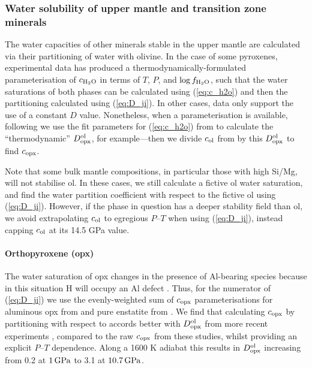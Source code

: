 \subsubsection{Water solubility of upper mantle and transition zone minerals}

The water capacities of other minerals stable in the upper mantle are calculated via their partitioning of water with olivine. In the case of some pyroxenes, experimental data has produced a thermodynamically-formulated parameterisation of $c_{\rm H_2O}$ in terms of $T$, $P$, and $\log f_{\rm H_2O}$, such that the water saturations of both phases can be calculated using (\ref{eq:c_h2o}) and then the partitioning calculated using (\ref{eq:D_ji}). In other cases, data only support the use of a constant $D$ value. Nonetheless, when a parameterisation is available, following \citet{dong_constraining_2021} we use the fit parameters for (\ref{eq:c_h2o}) from \citet{kohlstedt_solubility_1996} to calculate the ``thermodynamic'' $D^{\rm ol}_{\rm opx}$, for example---then we divide $c_{\rm ol}$ from \citet{dong_constraining_2021} by this $D^{\rm ol}_{\rm opx}$ to find $c_{\rm opx}$. %

Note that some bulk mantle compositions, in particular those with high Si/Mg, will not stabilise ol. In these cases, we still calculate a fictive ol water saturation, and find the water partition coefficient with respect to the fictive ol using (\ref{eq:D_ji}). However, if the phase in question has a deeper stability field than ol, we avoid extrapolating $c_{\rm ol}$ to egregious $P$--$T$ when using (\ref{eq:D_ji}), instead capping $c_{\rm ol}$ at its 14.5 GPa value.

\paragraph{Orthopyroxene (opx)}

The water saturation of opx changes in the presence of Al-bearing species because in this situation H will occupy an Al defect \citep{keppler_thermodynamics_2006}. Thus, for the numerator of (\ref{eq:D_ji}) we use the evenly-weighted sum of $c_{\rm opx}$ parameterisations for aluminous opx from \citet{mierdel_water_2007} and pure enstatite from \citet{mierdel_temperature_2004}. We find that calculating $c_{\rm opx}$ by partitioning with respect to \citet{kohlstedt_solubility_1996} accords better with $D^{\rm ol}_{\rm opx}$ from more recent experiments \citep{ferot_water_2012, demouchy_subsolidus_2017}, compared to the raw $c_{\rm opx}$ from these studies, whilst providing an explicit $P$--$T$ dependence. Along a 1600 K adiabat this results in $D^{\rm ol}_{\rm opx}$ increasing from 0.2 at $1\,{\rm GPa}$ to 3.1 at $10.7\,{\rm GPa}$.

